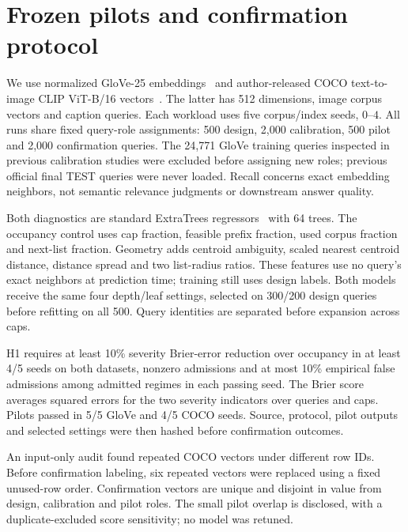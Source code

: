 \documentclass[a4paper,10pt]{esannV2}
\begin{document}
\newpage
\section{Frozen pilots and confirmation protocol}
We use normalized GloVe-25 embeddings~\cite{glove} and author-released COCO
text-to-image CLIP ViT-B/16 vectors~\cite{clip,cocodata}. The latter has 512
dimensions, image corpus vectors and caption queries. Each workload uses five
corpus/index seeds, $0$--$4$. All runs share fixed query-role assignments:
500 design, 2,000 calibration, 500 pilot and 2,000 confirmation queries.
The 24,771 GloVe training queries inspected in previous calibration studies
were excluded before assigning new roles; previous official final TEST queries
were never loaded. Recall concerns exact embedding neighbors, not semantic
relevance judgments or downstream answer quality.

Both diagnostics are standard ExtraTrees regressors~\cite{trees} with 64 trees.
The occupancy control uses cap fraction, feasible prefix fraction, used corpus
fraction and next-list fraction. Geometry adds centroid ambiguity, scaled nearest
centroid distance, distance spread and two list-radius ratios. These features
use no query's exact neighbors at prediction time; training still uses design
labels. Both models receive the same four depth/leaf settings, selected on
300/200 design queries before refitting on all 500. Query identities are separated
before expansion across caps.

H1 requires at least 10\% severity Brier-error reduction over occupancy in
at least 4/5 seeds on both datasets, nonzero admissions and at most 10\% empirical
false admissions among admitted regimes in each passing seed. The Brier score
averages squared errors for the two severity indicators over queries and caps.
Pilots passed in 5/5 GloVe and 4/5 COCO seeds. Source, protocol, pilot outputs
and selected settings were then hashed before confirmation outcomes.

An input-only audit found repeated COCO vectors under different row IDs.
Before confirmation labeling, six repeated vectors were replaced using a fixed
unused-row order. Confirmation vectors are unique and disjoint in value from
design, calibration and pilot roles. The small pilot overlap is disclosed, with
a duplicate-excluded score sensitivity; no model was retuned.

\begin{table}[!h]
\centering\small\setlength{\tabcolsep}{3pt}

\caption{Fresh confirmation: Brier error and relative gain, mean $\pm$ seed SD.
Gate counts repeat the unchanged full H1 criterion. Five seeds share query pools;
they are not independent external datasets.}
\end{table}
\end{document}
